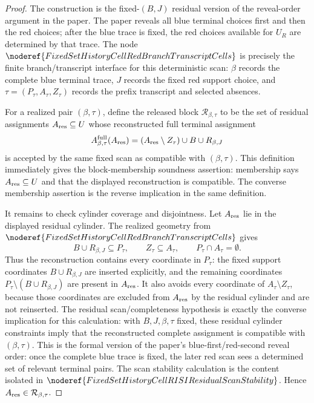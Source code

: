 \begin{proof}
The construction is the fixed-\((B,J)\) residual version of the reveal-order
argument in the paper.  The paper reveals all blue terminal choices first
and then the red choices; after the blue trace is fixed, the red choices
available for \(U_R\) are determined by that trace.  The node
\(\noderef{FixedSetHistoryCellRedBranchTranscriptCells}\) is precisely the
finite branch/transcript interface for this deterministic scan: \(\beta\)
records the complete blue terminal trace, \(J\) records the fixed red support
choice, and \(\tau=(P_\tau,A_\tau,Z_\tau)\) records the prefix transcript
and selected absences.

For a realized pair \((\beta,\tau)\), define the released block
\(\mathcal R_{\beta,\tau}\) to be the set of residual assignments
\(A_{\rm res}\subseteq U\) whose reconstructed full terminal assignment
\[
A^{\mathrm{full}}_{\beta,\tau}(A_{\rm res})
  =(A_{\rm res}\setminus Z_\tau)\cup B\cup R_{\beta,J}
\]
is accepted by the same fixed scan as compatible with
\((\beta,\tau)\).  This definition immediately gives the block-membership
soundness assertion: membership says \(A_{\rm res}\subseteq U\) and that the
displayed reconstruction is compatible.  The converse membership assertion
is the reverse implication in the same definition.

It remains to check cylinder coverage and disjointness.  Let
\(A_{\rm res}\) lie in the displayed residual cylinder.  The realized
geometry from
\(\noderef{FixedSetHistoryCellRedBranchTranscriptCells}\) gives
\[
B\cup R_{\beta,J}\subseteq P_\tau,\qquad
Z_\tau\subseteq A_\tau,\qquad P_\tau\cap A_\tau=\emptyset .
\]
Thus the reconstruction contains every coordinate in \(P_\tau\): the fixed
support coordinates \(B\cup R_{\beta,J}\) are inserted explicitly, and the
remaining coordinates \(P_\tau\setminus(B\cup R_{\beta,J})\) are present in
\(A_{\rm res}\).  It also avoids every coordinate of \(A_\tau\setminus
Z_\tau\), because those coordinates are excluded from \(A_{\rm res}\) by
the residual cylinder and are not reinserted.  The residual
scan/completeness hypothesis is exactly the converse implication for this
calculation: with \(B,J,\beta,\tau\) fixed, these residual cylinder
constraints imply that the reconstructed complete assignment is compatible
with \((\beta,\tau)\).  This is the formal version of the paper's
blue-first/red-second reveal order: once the complete blue trace is fixed,
the later red scan sees a determined set of relevant terminal pairs.  The
scan stability calculation is the content isolated in
\(\noderef{FixedSetHistoryCellRISIResidualScanStability}\).  Hence
\(A_{\rm res}\in\mathcal R_{\beta,\tau}\).


\end{proof}
